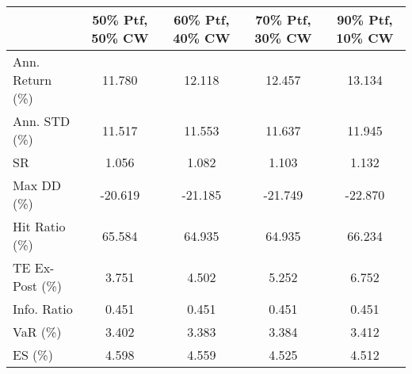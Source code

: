 \begin{tabular}{lcccc}
\toprule
{} &  50\% Ptf, 50\% CW &  60\% Ptf, 40\% CW &  70\% Ptf, 30\% CW &  90\% Ptf, 10\% CW \\
\midrule
Ann. Return (\%) &           11.780 &           12.118 &           12.457 &           13.134 \\
Ann. STD (\%)    &           11.517 &           11.553 &           11.637 &           11.945 \\
SR              &            1.056 &            1.082 &            1.103 &            1.132 \\
Max DD (\%)      &          -20.619 &          -21.185 &          -21.749 &          -22.870 \\
Hit Ratio (\%)   &           65.584 &           64.935 &           64.935 &           66.234 \\
TE Ex-Post (\%)  &            3.751 &            4.502 &            5.252 &            6.752 \\
Info. Ratio     &            0.451 &            0.451 &            0.451 &            0.451 \\
VaR (\%)         &            3.402 &            3.383 &            3.384 &            3.412 \\
ES (\%)          &            4.598 &            4.559 &            4.525 &            4.512 \\
\bottomrule
\end{tabular}
